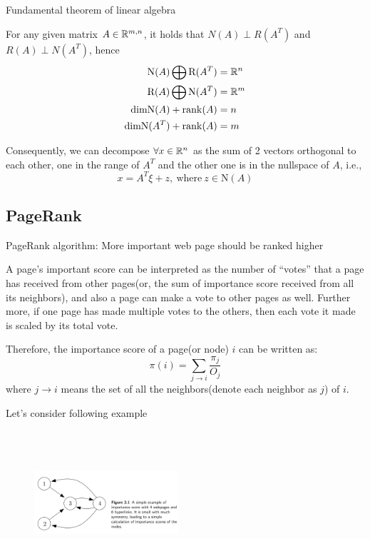 \begin{theorem}{Fundamental theorem of linear algebra}
	
	For any given matrix $A\in \mathbb{R}^{m,n}$, it holds that $N(A) \perp R(A^T)$ and $R(A) \perp N(A^T)$, hence
	\begin{align*}
	\text{N}(A) \bigoplus \text{R}(A^T) &= \mathbb{R}^n\\
	\text{R}(A) \bigoplus \text{N}(A^T) &= \mathbb{R}^m\\
	\text{dim} \text{N}(A) + \operatorname{rank}(A) &=n\\
	\text{dim} \text{N}(A^T) + \operatorname{rank}(A) &=m
	\end{align*}
\end{theorem}

Consequently, we can decompose $\forall x\in \mathbb{R}^n$ as the sum of 2 vectors orthogonal to each other, one in the range of $A^T$ and the other one is in the nullspace of $A$, i.e.,
$$x = A^T\xi + z,\ \text{where}\ z\in \text{N}(A)$$




\subsection{PageRank}


PageRank algorithm: More important web page should be ranked higher


A page's important score can be interpreted as the number of “votes” that a page has received from other pages(or, the sum of importance score received from all its neighbors), and also a page can make a vote to other pages as well. Further more, if one page has made multiple votes to the others, then each vote it made is scaled by its total vote.

Therefore, the importance score of a page(or node) $i$ can be written as:
$$\pi(i)=\sum_{j \rightarrow i}\frac{\pi_j}{O_j}$$
where $j \rightarrow i$ means the set of all the neighbors(denote each neighbor as $j$) of $i$.

Let's consider following example
\begin{figure}
	\centering
	\includegraphics[width=2.1in,height=2.1in]{figures/ch03/figure0.jpg}
\end{figure}


